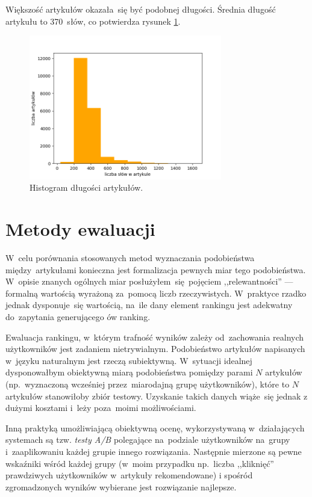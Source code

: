 \documentclass[pl]{minipw} %
\begin{document}
Większość artykułów okazała~się być podobnej długości. Średnia długość artykułu to 370~słów, co potwierdza rysunek	\ref{fig:lenghts}.

\begin{figure}[H]
	\centering
	\includegraphics[width=0.75\textwidth]{img/articles_length_hist.png}
	\caption{Histogram długości artykułów.}
	\label{fig:lenghts}
\end{figure}

\chapter{Metody ewaluacji}

W~celu porównania stosowanych metod wyznaczania podobieństwa między~artykułami konieczna jest formalizacja pewnych miar tego podobieństwa. W~opisie znanych ogólnych miar posłużyłem~się pojęciem ,,relewantności'' --- formalną wartością wyrażoną za~pomocą liczb rzeczywistych. W~praktyce rzadko jednak dysponuje~się wartością, na~ile dany element rankingu jest adekwatny do~zapytania generującego ów ranking.  

Ewaluacja rankingu, w~którym trafność wyników zależy od~zachowania realnych użytkowników jest zadaniem nietrywialnym. Podobieństwo artykułów napisanych w~języku naturalnym jest rzeczą subiektywną. W~sytuacji idealnej dysponowałbym obiektywną miarą podobieństwa pomiędzy parami $N$ artykułów (np.~wyznaczoną wcześniej przez~miarodajną grupę użytkowników), które to $N$ artykułów stanowiłoby zbiór testowy. Uzyskanie takich danych wiąże~się jednak z dużymi kosztami i~leży poza~moimi możliwościami.

Inną praktyką umożliwiającą obiektywną ocenę, wykorzystywaną w~działających systemach są tzw. \textit{testy A/B} polegające na~podziale użytkowników na~grupy i~zaaplikowaniu każdej grupie innego rozwiązania. Następnie mierzone są pewne wskaźniki wśród każdej grupy (w~moim przypadku np.~liczba ,,kliknięć'' prawdziwych użytkowników w~artykuły rekomendowane) i spośród zgromadzonych wyników wybierane jest rozwiązanie najlepsze.
\end{document}
